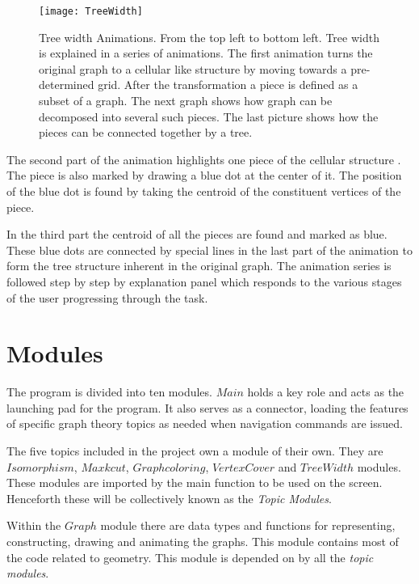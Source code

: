 \begin{figure}[ht]
\centering
\texttt{[image: TreeWidth]}
\caption{
        Tree width Animations. From the top left to bottom left. Tree width is
        explained in a series of animations. The first animation turns the
        original graph to a cellular like structure by moving towards a
        pre-determined grid.  After the transformation a piece is defined as a
        subset of a graph.  The next graph shows how graph can be decomposed
        into several such pieces.  The last picture shows how the pieces can be
        connected together by a tree.
        }
\label{animationfigure: vertexCover}
\end{figure}

The second part of the animation highlights one piece of the cellular structure
. The piece is also marked by drawing a blue dot at the center
of it. The position of the blue dot is found by taking the centroid of the
constituent vertices of the piece.

In the third part the centroid of all the pieces are found and marked as blue.
These blue dots are connected by special lines in the last part of the
animation to form the tree structure inherent in the original graph. The animation series is followed step by step by explanation panel which responds
to the various stages of the user progressing through the task.


\section{Modules}

The program is divided into ten modules.  $Main$ holds a key role and acts as the launching pad for the program. It also serves as a connector, loading the features of specific graph theory topics as needed when navigation commands are issued.

The five topics included in the project own a module of their own. They are
$Isomorphism$, $Maxkcut$, $Graphcoloring$, $VertexCover$ and $TreeWidth$ modules.
These modules are imported by the main function to be used on the screen.
Henceforth these will be collectively known as the \emph{Topic Modules}.

Within the $Graph$ module there are data types and functions for representing,
constructing, drawing and animating the graphs. This module contains most of the
code related to geometry. This module is depended on by all the \emph{topic modules}.

